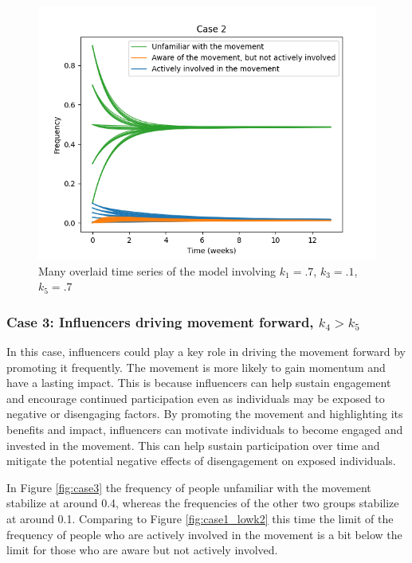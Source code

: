 \documentclass{article}
\begin{document}
    \begin{figure}[H]

        \centering
        \includegraphics[width=\textwidth]{simulation/plots/case2-lowk4.png}   
        \caption{Many overlaid time series of the model involving \mbox{$k_1=.7$}, \mbox{$k_3=.1$}, \mbox{$k_5=.7$}}
        \label{fig:case2_lowk4}
    \end{figure}
    
    \subsubsection*{Case 3: Influencers driving movement forward, $k_4 > k_5$} \normalfont
 
     In this case, influencers could play a key role in driving the movement forward by promoting it frequently. The movement is more likely to gain momentum and have a lasting impact. This is because influencers can help sustain engagement and encourage continued participation even as individuals may be exposed to negative or disengaging factors. By promoting the movement and highlighting its benefits and impact, influencers can motivate individuals to become engaged and invested in the movement. This can help sustain participation over time and mitigate the potential negative effects of disengagement on exposed individuals.

    In Figure \ref{fig:case3} the frequency of people unfamiliar with the movement stabilize at around 0.4, whereas the frequencies of the other two groups stabilize at around 0.1. Comparing to Figure \ref{fig:case1_lowk2} this time the limit of the frequency of people who are actively involved in the movement is a bit below the limit for those who are aware but not actively involved.
     
\end{document}
